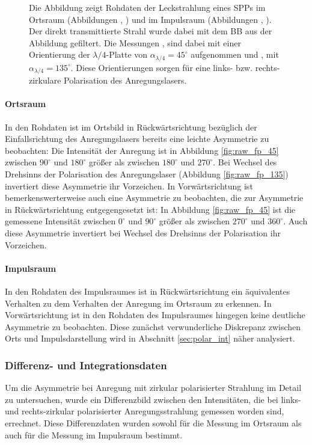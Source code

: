 \documentclass[titlepage,  ngerman]{article}
\begin{document}
\begin{figure}[h]
\begin{subfigure}{0.5\textwidth}
		\end{subfigure}
		\caption[Rohdaten PSHE]{Die Abbildung zeigt Rohdaten der Leckstrahlung eines SPPs im Ortsraum (Abbildungen , ) und im Impulsraum (Abbildungen , ). Der direkt transmittierte Strahl wurde dabei mit dem BB aus der Abbildung gefiltert. Die Messungen ,  sind dabei mit einer Orientierung der $\lambda / 4$-Platte von $\alpha_{\lambda/4} = 45^\circ$ aufgenommen und ,  mit $\alpha_{\lambda/4} = 135^\circ$. Diese Orientierungen sorgen für eine links- bzw. rechts-zirkulare Polarisation des Anregungslasers.}
		\label{fig:measure_pshe_raw}			
	\end{figure}
	\paragraph{Ortsraum}
	In den Rohdaten ist im Ortsbild in Rückwärtsrichtung bezüglich der Einfallsrichtung des Anregungslasers bereits eine leichte Asymmetrie zu beobachten: Die Intensität der Anregung ist in Abbildung \ref{fig:raw_fp_45} zwischen $90^\circ$ und $180^\circ$ größer als zwischen $180^\circ$ und $270^\circ$. Bei Wechsel des Drehsinns der Polarisation des Anregungslaser (Abbildung \ref{fig:raw_fp_135}) invertiert diese Asymmetrie ihr Vorzeichen. In Vorwärtsrichtung ist bemerkenswerterweise auch eine Asymmetrie zu beobachten, die zur Asymmetrie in Rückwärtsrichtung entgegengesetzt ist: In Abbildung \ref{fig:raw_fp_45} ist die gemessene Intensität zwischen $0^\circ$ und $90^\circ$ größer als zwischen $270^\circ$ und $360^\circ$. Auch diese Asymmetrie invertiert bei Wechsel des Drehsinns der Polarisation ihr Vorzeichen. 
	\paragraph{Impulsraum} 
	In den Rohdaten des Impulsraumes ist in Rückwärtsrichtung ein äquivalentes Verhalten zu dem Verhalten der Anregung im Ortsraum zu erkennen. In Vorwärtsrichtung ist in den Rohdaten des Impulsraumes hingegen keine deutliche Asymmetrie zu beobachten. Diese zunächst verwunderliche Diskrepanz zwischen Orts und Impulsdarstellung wird in Abschnitt \ref{sec:polar_int} näher analysiert.
	\subsubsection{Differenz- und Integrationsdaten}
		Um die Asymmetrie bei Anregung mit zirkular polarisierter Strahlung im Detail zu untersuchen, wurde ein Differenzbild zwischen den Intensitäten, die bei links- und rechts-zirkular polarisierter Anregungsstrahlung gemessen worden sind, errechnet. Diese Differenzdaten wurden sowohl für die Messung im Ortsraum als auch für die Messung im Impulsraum bestimmt.			
\end{document}
